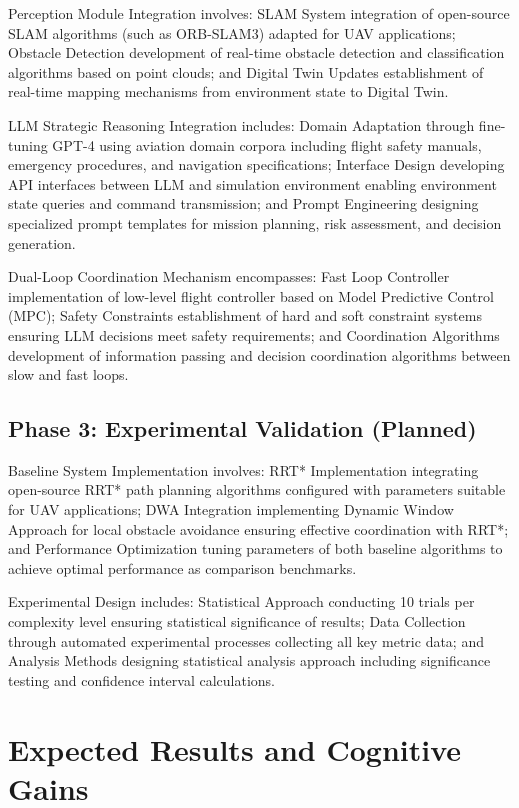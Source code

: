 Perception Module Integration involves: SLAM System integration of open-source SLAM algorithms (such as ORB-SLAM3) adapted for UAV applications; Obstacle Detection development of real-time obstacle detection and classification algorithms based on point clouds; and Digital Twin Updates establishment of real-time mapping mechanisms from environment state to Digital Twin.

LLM Strategic Reasoning Integration includes: Domain Adaptation through fine-tuning GPT-4 using aviation domain corpora including flight safety manuals, emergency procedures, and navigation specifications; Interface Design developing API interfaces between LLM and simulation environment enabling environment state queries and command transmission; and Prompt Engineering designing specialized prompt templates for mission planning, risk assessment, and decision generation.

Dual-Loop Coordination Mechanism encompasses: Fast Loop Controller implementation of low-level flight controller based on Model Predictive Control (MPC); Safety Constraints establishment of hard and soft constraint systems ensuring LLM decisions meet safety requirements; and Coordination Algorithms development of information passing and decision coordination algorithms between slow and fast loops.

\subsection{Phase 3: Experimental Validation (Planned)}

Baseline System Implementation involves: RRT* Implementation integrating open-source RRT* path planning algorithms configured with parameters suitable for UAV applications; DWA Integration implementing Dynamic Window Approach for local obstacle avoidance ensuring effective coordination with RRT*; and Performance Optimization tuning parameters of both baseline algorithms to achieve optimal performance as comparison benchmarks.

Experimental Design includes: Statistical Approach conducting 10 trials per complexity level ensuring statistical significance of results; Data Collection through automated experimental processes collecting all key metric data; and Analysis Methods designing statistical analysis approach including significance testing and confidence interval calculations.

\section{Expected Results and Cognitive Gains}

